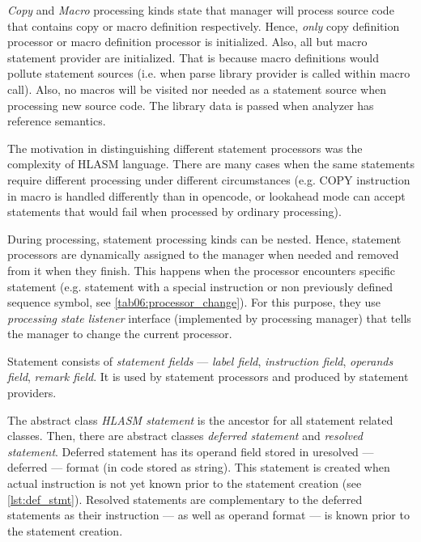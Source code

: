 \emph{Copy} and \emph{Macro} processing kinds state that manager will process source code that contains copy or macro definition respectively. Hence, \emph{only} copy definition processor or macro definition processor is initialized. Also, all but macro statement provider are initialized. That is because macro definitions would pollute statement sources (i.e. when parse library provider is called within macro call). Also, no macros will be visited nor needed as a statement source when processing new source code. The library data is passed when analyzer has reference semantics.



\label{lab06:sect_proc}

The motivation in distinguishing different statement processors was the complexity of HLASM language. There are many cases when the same statements require different processing under different circumstances (e.g. COPY instruction in macro is handled differently than in opencode, or lookahead mode can accept statements that would fail when processed by ordinary processing).

During processing, statement processing kinds can be nested. Hence, statement processors are dynamically assigned to the manager when needed and removed from it when they finish. This happens when the processor encounters specific statement (e.g. statement with a special instruction or non previously defined sequence symbol, see \cref{tab06:processor_change}). For this purpose, they use \emph{processing state listener} interface (implemented by processing manager) that tells the manager to change the current processor.

Statement consists of \emph{statement fields} --- \emph{label field}, \emph{instruction field}, \emph{operands field}, \emph{remark field}. It is used by statement processors and produced by statement providers. 

The abstract class \emph{HLASM statement} is the ancestor for all statement related classes. Then, there are abstract classes \emph{deferred statement} and \emph{resolved statement}. Deferred statement has its operand field stored in uresolved --- deferred --- format (in code stored as string). This statement is created when actual instruction is not yet known prior to the statement creation (see \cref{lst:def_stmt}). Resolved statements are complementary to the deferred statements as their instruction --- as well as operand format --- is known prior to the statement creation.

